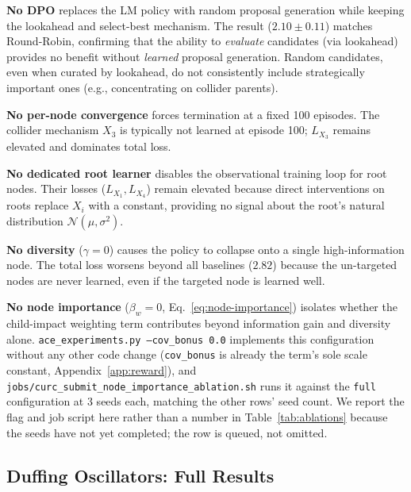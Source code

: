 \textbf{No DPO} replaces the LM policy with random proposal generation while keeping the lookahead and select-best mechanism. The result ($2.10\pm0.11$) matches Round-Robin, confirming that the ability to \emph{evaluate} candidates (via lookahead) provides no benefit without \emph{learned} proposal generation. Random candidates, even when curated by lookahead, do not consistently include strategically important ones (e.g., concentrating on collider parents).

\textbf{No per-node convergence} forces termination at a fixed 100 episodes. The collider mechanism $X_3$ is typically not learned at episode 100; $L_{X_3}$ remains elevated and dominates total loss.

\textbf{No dedicated root learner} disables the observational training loop for root nodes. Their losses ($L_{X_1}, L_{X_4}$) remain elevated because direct interventions on roots replace $X_i$ with a constant, providing no signal about the root's natural distribution $\mathcal{N}(\mu, \sigma^2)$.

\textbf{No diversity} ($\gamma=0$) causes the policy to collapse onto a single high-information node. The total loss worsens beyond all baselines ($2.82$) because the un-targeted nodes are never learned, even if the targeted node is learned well.

\textbf{No node importance} ($\beta_w=0$, Eq.~\ref{eq:node-importance}) isolates whether the child-impact weighting term contributes beyond information gain and diversity alone. \texttt{ace\_experiments.py --cov\_bonus 0.0} implements this configuration without any other code change (\texttt{cov\_bonus} is already the term's sole scale constant, Appendix~\ref{app:reward}), and \texttt{jobs/curc\_submit\_node\_importance\_ablation.sh} runs it against the \texttt{full} configuration at 3 seeds each, matching the other rows' seed count. We report the flag and job script here rather than a number in Table~\ref{tab:ablations} because the seeds have not yet completed; the row is queued, not omitted.

\subsection{Duffing Oscillators: Full Results}
\label{app:duffing}

